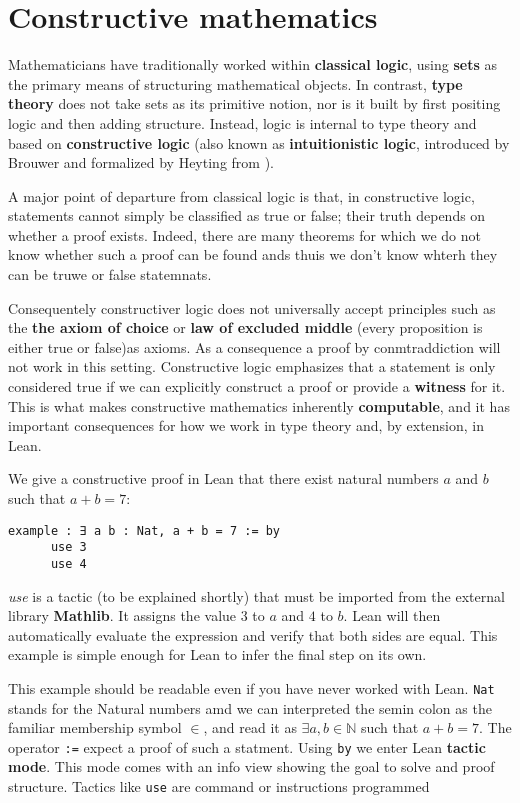 
\section{Constructive mathematics}

Mathematicians have traditionally worked within \textbf{classical logic}, 
using \textbf{sets} as the primary means of structuring mathematical objects. 
In contrast, \textbf{type theory} does not take sets as its primitive notion, 
nor is it built by first positing logic and then adding structure. 
Instead, logic is internal to type theory and based on \textbf{constructive logic} 
(also known as \textbf{intuitionistic logic}, 
introduced by Brouwer and formalized by Heyting from \cite{girard1989proofs}).

A major point of departure from classical logic is that, in constructive logic, 
statements cannot simply be classified as true or false; 
their truth depends on whether a proof exists. 
Indeed, there are many theorems for which we do not know whether such a 
proof can be found ands thuis we don't know whterh they can be truwe or false statemnats.


Consequentely constructiver logic does not universally accept principles such as the \textbf{the axiom of choice} or  \textbf{law of excluded middle} 
(every proposition is either true or false)as axioms. 
As a consequence a proof by conmtraddiction will not work in this setting.
Constructive logic emphasizes that a statement is only considered true if we can explicitly construct 
a proof or provide a \textbf{witness} for it.
This is what makes constructive mathematics inherently \textbf{computable}, 
and it has important consequences for how we work in type theory and, by extension, 
in Lean.

\begin{example}
    We give a constructive proof in Lean that there exist natural numbers $a$ and $b$ such that $a + b = 7$:

    \begin{lstlisting}[language=Lean]
    example : ∃ a b : Nat, a + b = 7 := by
      use 3
      use 4
    \end{lstlisting}

    \textit{use} is a tactic (to be explained shortly) that must be imported from the external 
    library \textbf{Mathlib}. It assigns the value $3$ to $a$ and $4$ to $b$.  
    Lean will then automatically evaluate the expression and verify that both sides are equal.  
    This example is simple enough for Lean to infer the final step on its own.

\end{example}
This example should be readable even if you have never worked with Lean.
\lstinline|Nat| stands for the Natural numbers amd we can interpreted 
the semin colon as the familiar membership symbol $\in$, 
and read it as $\exists a, b \in \mathbb{N}$ such that $a + b = 7$.
The operator \lstinline|:=| expect a proof of such a statment.
Using \lstinline|by| we enter Lean \textbf{tactic mode}.
This mode comes with an info view showing the goal to solve and proof structure.
Tactics like \lstinline|use| are command or instructions programmed

